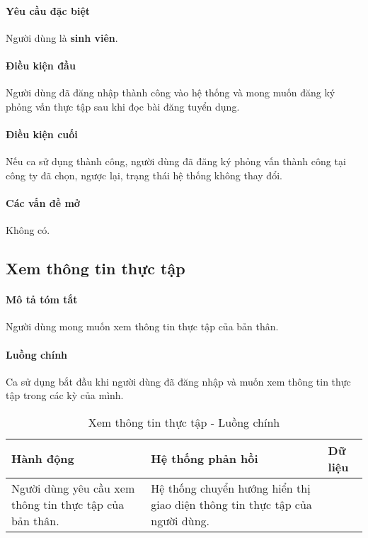\documentclass[./../main.tex]{subfiles}
\begin{document}
\paragraph*{Yêu cầu đặc biệt}

Người dùng là \textbf{sinh viên}.

\paragraph*{Điều kiện đầu}

Người dùng đã đăng nhập thành công vào hệ thống và mong muốn đăng ký
phỏng vấn thực tập sau khi đọc bài đăng tuyển dụng.

\paragraph*{Điều kiện cuối}

Nếu ca sử dụng thành công, người dùng đã đăng ký phỏng vấn thành công
tại công ty đã chọn, ngược lại, trạng thái hệ thống không thay đổi.

\paragraph*{Các vấn đề mở}

Không có.

\subsection{Xem thông tin thực tập}

\paragraph*{Mô tả tóm tắt}

Người dùng mong muốn xem thông tin thực tập của bản thân.

\paragraph*{Luồng chính} Ca sử dụng bắt đầu khi người dùng đã đăng nhập và muốn xem thông tin thực tập trong các kỳ của mình.

\begin{table}[H]
  \caption{Xem thông tin thực tập - Luồng chính}
  \label{tab:read_internship_info}
  \begin{tabularx}{\textwidth}{|X|X|X|}
  \hline
  \textbf{Hành động}                                      & \textbf{Hệ thống phản hồi}                                                  & \textbf{Dữ liệu} \\ \hline
  Người dùng yêu cầu xem thông tin thực tập của bản thân. & Hệ thống chuyển hướng hiển thị giao diện thông tin thực tập của người dùng. &                  \\ \hline
  \end{tabularx}
\end{table}
\end{document}
